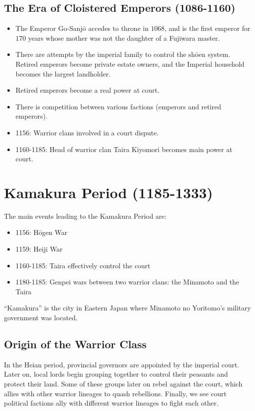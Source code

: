 \documentclass[class=article, crop=false]{standalone}
\begin{document}
  \subsection{The Era of Cloistered Emperors (1086-1160)}
  \begin{itemize}
    \item The Emperor Go-Sanj\=o accedes to throne in $1068$, and is the first emperor for $170$ years whose mother was not the daughter of a Fujiwara master.
    \item There are attempts by the imperial family to control the sh\=oen system. Retired emperors become private estate owners, and the Imperial household becomes the largest landholder.
    \item Retired emperors become a real power at court.
    \item There is competition between various factions (emperors and retired emperors).
    \item 1156: Warrior clans involved in a court dispute.
    \item 1160-1185: Head of warrior clan Taira Kiyomori becomes main power at court.
  \end{itemize}
  \section{Kamakura Period (1185-1333)}
  The main events leading to the Kamakura Period are:
  \begin{itemize}
    \item 1156: H\=ogen War
    \item 1159: Heiji War
    \item 1160-1185: Taira effectively control the court
    \item 1180-1185: Genpei wars between two warrior clans: the Minamoto and the Taira
  \end{itemize}
  ``Kamakura'' is the city in Eastern Japan where Minamoto no Yoritomo's military government was located.
  \subsection{Origin of the Warrior Class}
  In the Heian period, provincial governors are appointed by the imperial court. Later on, local lords begin grouping together to control their peasants and protect their land. Some of these groups later on rebel against the court, which allies with other warrior lineages to quash rebellions. Finally, we see court political factions ally with different warrior lineages to fight each other.
\end{document}
